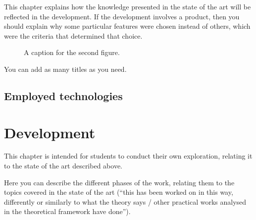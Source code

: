 \documentclass[english]{utad-tfg}
\begin{document}
\begin{figure}[H]
  \centering
  \caption{}
  \label{fig:one}
\end{figure}

This chapter explains how the knowledge presented in the state of the art
will be reflected in the development. If the development involves a
product, then you should explain why some particular features were chosen
instead of others, which were the criteria that determined that choice.

\begin{figure}[H]
  \centering
  \caption{A caption for the second figure. }
  \label{fig:two}
\end{figure}

You can add as many titles as you need.

\setcounter{section}{1}
\section{Employed technologies}

\chapter{Development}

This chapter is intended for students to conduct their own exploration,
relating it to the state of the art described above.

Here you can describe the different phases of the work, relating them to
the topics covered in the state of the art (``this has been worked on in
this way, differently or similarly to what the theory says / other
practical works analysed in the theoretical framework have done'').
\end{document}
